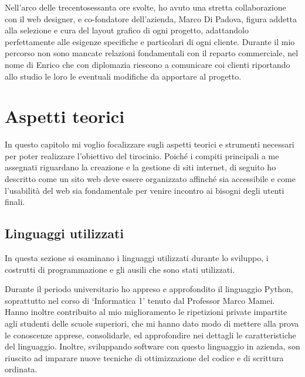 \documentclass[12pt,a4paper]{article}
\begin{document}
Nell’arco delle trecentosessanta ore svolte, ho avuto una stretta collaborazione con il web designer, e co-fondatore dell’azienda, Marco Di Padova, figura addetta alla selezione e cura del layout grafico di ogni progetto, adattandolo perfettamente alle esigenze specifiche e particolari di ogni cliente.
Durante il mio percorso non sono mancate relazioni fondamentali con il reparto commerciale, nel nome di Enrico che con diplomazia riescono a comunicare coi clienti riportando allo studio le loro le eventuali modifiche da apportare al progetto.

\clearpage
\section{Aspetti teorici}
In questo capitolo mi voglio focalizzare sugli aspetti teorici e strumenti necessari per poter realizzare l’obiettivo del tirocinio. Poiché i compiti principali a me assegnati riguardano la creazione e la gestione di siti internet, di seguito ho descritto come un sito web deve essere organizzato affinché sia accessibile e come l’usabilità del web sia fondamentale per venire incontro ai bisogni degli utenti finali.

\subsection{Linguaggi utilizzati}
In questa sezione si esaminano i linguaggi utilizzati durante lo sviluppo, i costrutti di programmazione e gli ausili che sono stati utilizzati.

Durante il periodo universitario ho appreso e approfondito il linguaggio Python, soprattutto nel corso di ‘Informatica 1’ tenuto dal Professor Marco Mamei. Hanno inoltre contribuito al mio miglioramento le ripetizioni private impartite agli studenti delle scuole superiori, che mi hanno dato modo di mettere alla prova le conoscenze apprese, consolidarle, ed approfondire nei dettagli le caratteristiche del linguaggio.
Inoltre, sviluppando software con questo linguaggio in azienda, son riuscito ad imparare nuove tecniche di ottimizzazione del codice e di scrittura ordinata.
\end{document}
